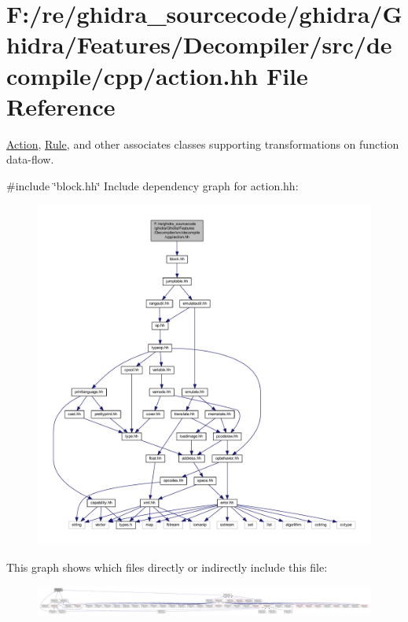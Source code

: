 \hypertarget{action_8hh}{}\section{F\+:/re/ghidra\+\_\+sourcecode/ghidra/\+Ghidra/\+Features/\+Decompiler/src/decompile/cpp/action.hh File Reference}
\label{action_8hh}


\mbox{\hyperlink{class_action}{Action}}, \mbox{\hyperlink{class_rule}{Rule}}, and other associates classes supporting transformations on function data-\/flow.  


{\ttfamily \#include \char`\"{}block.\+hh\char`\"{}}\newline
Include dependency graph for action.\+hh\+:
\nopagebreak
\begin{figure}[H]
\begin{center}
\leavevmode
\includegraphics[width=350pt]{action_8hh__incl}
\end{center}
\end{figure}
This graph shows which files directly or indirectly include this file\+:
\nopagebreak
\begin{figure}[H]
\begin{center}
\leavevmode
\includegraphics[width=350pt]{action_8hh__dep__incl}
\end{center}
\end{figure}
